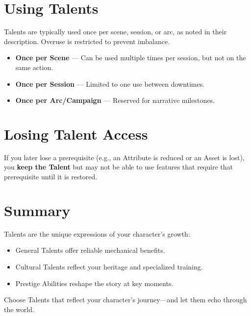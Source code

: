 \section{Using Talents}

Talents are typically used once per scene, session, or arc, as noted in their description. Overuse is restricted to prevent imbalance.

\begin{itemize}
  \item \textbf{Once per Scene} — Can be used multiple times per session, but not on the same action.
  \item \textbf{Once per Session} — Limited to one use between downtimes.
  \item \textbf{Once per Arc/Campaign} — Reserved for narrative milestones.
\end{itemize}

\section{Losing Talent Access}

If you later lose a prerequisite (e.g., an Attribute is reduced or an Asset is lost), you \textbf{keep the Talent} but may not be able to use features that require that prerequisite until it is restored.

\section{Summary}

Talents are the unique expressions of your character's growth:

\begin{itemize}
  \item General Talents offer reliable mechanical benefits.
  \item Cultural Talents reflect your heritage and specialized training.
  \item Prestige Abilities reshape the story at key moments.
\end{itemize}

Choose Talents that reflect your character's journey—and let them echo through the world.

